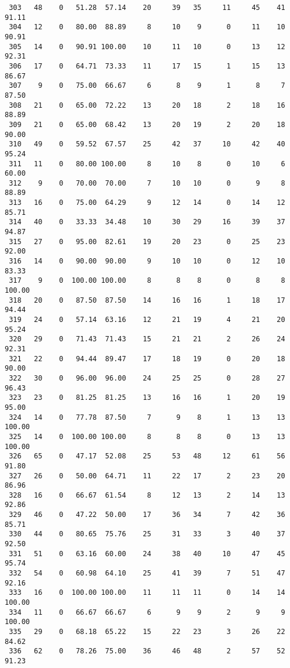 \begin{verbatim}
 303   48    0   51.28  57.14    20     39   35     11     45    41    91.11
 304   12    0   80.00  88.89     8     10    9      0     11    10    90.91
 305   14    0   90.91 100.00    10     11   10      0     13    12    92.31
 306   17    0   64.71  73.33    11     17   15      1     15    13    86.67
 307    9    0   75.00  66.67     6      8    9      1      8     7    87.50
 308   21    0   65.00  72.22    13     20   18      2     18    16    88.89
 309   21    0   65.00  68.42    13     20   19      2     20    18    90.00
 310   49    0   59.52  67.57    25     42   37     10     42    40    95.24
 311   11    0   80.00 100.00     8     10    8      0     10     6    60.00
 312    9    0   70.00  70.00     7     10   10      0      9     8    88.89
 313   16    0   75.00  64.29     9     12   14      0     14    12    85.71
 314   40    0   33.33  34.48    10     30   29     16     39    37    94.87
 315   27    0   95.00  82.61    19     20   23      0     25    23    92.00
 316   14    0   90.00  90.00     9     10   10      0     12    10    83.33
 317    9    0  100.00 100.00     8      8    8      0      8     8   100.00
 318   20    0   87.50  87.50    14     16   16      1     18    17    94.44
 319   24    0   57.14  63.16    12     21   19      4     21    20    95.24
 320   29    0   71.43  71.43    15     21   21      2     26    24    92.31
 321   22    0   94.44  89.47    17     18   19      0     20    18    90.00
 322   30    0   96.00  96.00    24     25   25      0     28    27    96.43
 323   23    0   81.25  81.25    13     16   16      1     20    19    95.00
 324   14    0   77.78  87.50     7      9    8      1     13    13   100.00
 325   14    0  100.00 100.00     8      8    8      0     13    13   100.00
 326   65    0   47.17  52.08    25     53   48     12     61    56    91.80
 327   26    0   50.00  64.71    11     22   17      2     23    20    86.96
 328   16    0   66.67  61.54     8     12   13      2     14    13    92.86
 329   46    0   47.22  50.00    17     36   34      7     42    36    85.71
 330   44    0   80.65  75.76    25     31   33      3     40    37    92.50
 331   51    0   63.16  60.00    24     38   40     10     47    45    95.74
 332   54    0   60.98  64.10    25     41   39      7     51    47    92.16
 333   16    0  100.00 100.00    11     11   11      0     14    14   100.00
 334   11    0   66.67  66.67     6      9    9      2      9     9   100.00
 335   29    0   68.18  65.22    15     22   23      3     26    22    84.62
 336   62    0   78.26  75.00    36     46   48      2     57    52    91.23

\end{verbatim}
